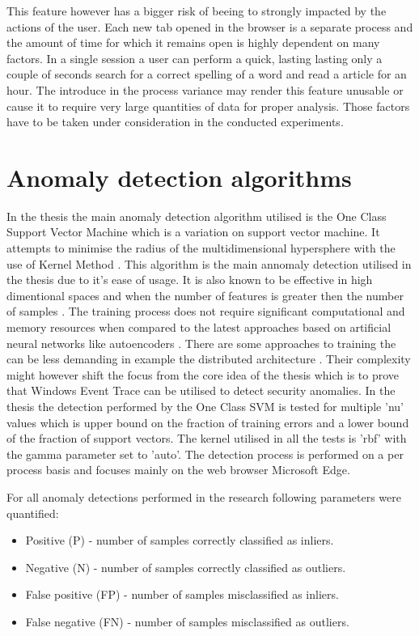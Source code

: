 \documentclass[a4paper,twoside,12pt]{book}
\begin{document}
This feature however has a bigger risk of beeing to strongly impacted by the actions of the user. 
Each new tab opened in the browser is a separate process and the amount of time for which it remains
open is highly dependent on many factors. In a single session a user can perform a quick, lasting 
lasting only a couple of seconds search for a correct spelling of a word and read a article for 
an hour. The introduce in the process variance may render this feature unusable or cause it to
require very large quantities of data for proper analysis. Those factors have to be taken 
under consideration in the conducted experiments.


\section{Anomaly detection algorithms}
In the thesis the main anomaly detection algorithm utilised is the One Class Support 
Vector Machine which is a variation on support vector machine. It attempts to minimise 
the radius of the multidimensional hypersphere with the use of Kernel Method \cite{bib:ocsvm}. 
This algorithm is the main annomaly detection utilised in the thesis due to it's ease of
usage. It is also known to be effective in high dimentional spaces and when 
the number of features is greater then the number of samples \cite{bib:svms}. The training process 
does not require significant computational and memory resources when compared to the latest
approaches based on artificial neural networks like autoencoders \cite{bib:autoencoder}. There are
some approaches to training the can be less demanding in example the distributed architecture
\cite{bib:autoencoderDist}. Their complexity might however shift the focus from the core idea 
of the thesis which is to prove that Windows Event Trace can be utilised to detect security
anomalies. In the thesis the detection performed by the One Class SVM is tested for multiple 'nu'
values which is upper bound on the fraction of training errors and a lower bound of the 
fraction of support vectors\cite{bib:skocsvm}. The kernel utilised in all the tests is 'rbf' with
the gamma parameter set to 'auto'. The detection process is performed 
on a per process basis and focuses mainly on the web browser Microsoft Edge. 

For all anomaly detections performed in the research following parameters were quantified:
\begin{itemize}
	\item Positive (P) - number of samples correctly classified as inliers.
	\item Negative (N) - number of samples correctly classified as outliers.
	\item False positive (FP) - number of samples misclassified as inliers. 
	\item False negative (FN) - number of samples misclassified as outliers.
\end{itemize}
\end{document}
